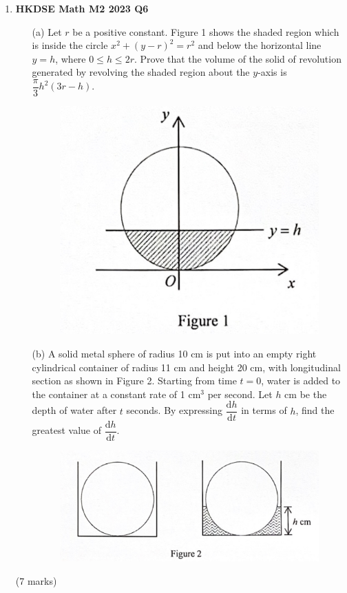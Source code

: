 \documentclass{report}
\begin{document}
\begin{enumerate}
	\newpage

	\item \textbf{HKDSE Math M2 2023 Q6}
	\begin{enumerate}
		\item [(a)]Let $r$ be a positive constant. Figure 1 shows the shaded region which is inside the circle $x^2 + (y-r)^2 = r^2$ and below the horizontal line $y = h$, where $0 \leq h \leq 2r$. Prove that the volume of the solid of revolution generated by revolving the shaded region about the $y$-axis is $\dfrac{\pi}{3}h^2(3r-h)$.
		\begin{figure}[H]
			\centering
			\includegraphics[width = .5\linewidth]{2023Figure1}
		\end{figure}
		\item [(b)]A solid metal sphere of radius 10 cm is put into an empty right cylindrical container of radius 11 cm and height 20 cm, with longitudinal section as shown in Figure 2. Starting from time $t=0$, water is added to the container at a constant rate of 1 cm$^3$ per second. Let $h$ cm be the depth of water after $t$ seconds. By expressing $\dfrac{\text{d}h}{\text{d}t}$ in terms of $h$, find the greatest value of $\dfrac{\text{d}h}{\text{d}t}$.
		\begin{figure}[H]
			\centering
			\includegraphics[width = .5\linewidth]{2023Figure2}
		\end{figure}
	\end{enumerate}
	(7 marks)


\end{enumerate}
\end{document}
